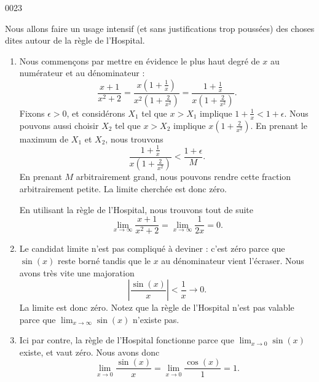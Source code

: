 
\begin{corrige}{0023}

Nous allons faire un usage intensif (et sans justifications trop poussées) des choses dites autour de la règle de l'Hospital.

\begin{enumerate}

\item
 Nous commençons par mettre en évidence le plus haut degré de $x$ au numérateur et au dénominateur :
\begin{equation}
	\frac{ x+1 }{ x^2+2 }=\frac{ x\left( 1+\frac{1}{ x } \right) }{ x^2\left( 1+\frac{ 2 }{ x^2 } \right) }=\frac{ 1+\frac{1}{ x } }{ x\left( 1+\frac{ 2 }{ x^2 } \right) }.
\end{equation}
Fixons $\epsilon>0$, et considérons $X_1$ tel que $x>X_1$ implique $1+\frac{1}{ x }<1+\epsilon$. Nous pouvons aussi choisir $X_2$ tel que $x>X_2$ implique $x\left( 1+\frac{ 2 }{ x^2 } \right)$. En prenant le maximum de $X_1$ et $X_2$, nous trouvons
\begin{equation}
\frac{ 1+\frac{1}{ x } }{ x\left( 1+\frac{ 2 }{ x^2 } \right) }<\frac{ 1+\epsilon }{ M }.
\end{equation}
En prenant $M$ arbitrairement grand, nous pouvons rendre cette fraction arbitrairement petite. La limite cherchée est donc zéro.

\begin{alternative}
En utilisant la règle de l'Hospital, nous trouvons tout de suite
\begin{equation}
	\lim_{x\to\infty}\frac{ x+1 }{ x^2+2 }=\lim_{x\to\infty}\frac{ 1 }{ 2x }=0.
\end{equation}
\end{alternative}

\item
Le candidat limite n'est pas compliqué à deviner : c'est zéro parce que $\sin(x)$ reste borné tandis que le $x$ au dénominateur vient l'écraser. Nous avons très vite une majoration
\begin{equation}
	\left| \frac{ \sin(x)}{ x } \right| <\frac{1}{ x }\to 0.
\end{equation}
La limite est donc zéro. Notez que la règle de l'Hospital n'est pas valable parce que $\lim_{x\to\infty}\sin(x)$ n'existe pas.

\item
Ici par contre, la règle de l'Hospital fonctionne parce que $\lim_{x\to0}\sin(x)$ existe, et vaut zéro. Nous avons donc
\begin{equation}
	\lim_{x\to 0}\frac{ \sin(x) }{ x }=\lim_{x\to 0}\frac{ \cos(x) }{ 1 }=1.
\end{equation}


\end{enumerate}
\end{corrige}
